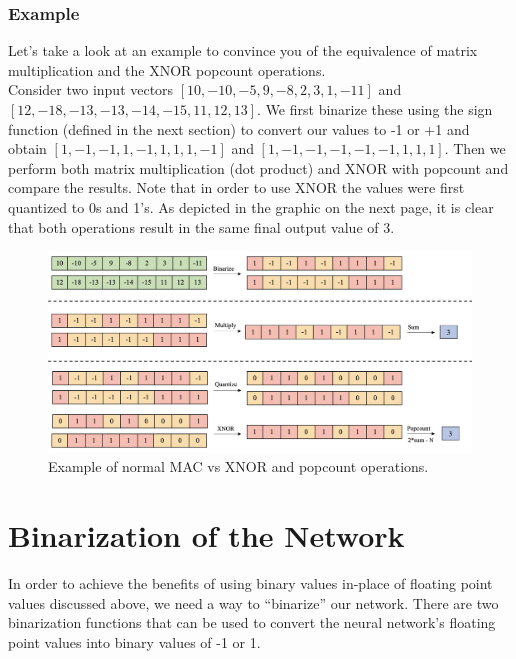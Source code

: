 \subsubsection{Example}
Let's take a look at an example to convince you of the equivalence of matrix multiplication and the XNOR popcount operations. \\

Consider two input vectors $[10, -10, -5, 9, -8, 2, 3, 1, -11]$ and $[12, -18, -13, -13, -14, -15, 11, 12, 13].$ We first binarize these using the sign function (defined in the next section) to convert our values to -1 or +1 and obtain $[1, -1, -1, 1, -1, 1, 1, 1, -1]$ and $[1, -1, -1, -1, -1, -1, 1, 1, 1]$. Then we perform both matrix multiplication (dot product) and XNOR with popcount and compare the results. Note that in order to use XNOR the values were first quantized to 0s and 1's. As depicted in the graphic on the next page, it is clear that both operations result in the same final output value of $3$. \\

\begin{figure}[htbp]
\centerline{\includegraphics[scale = .50]{images/example.png}}
\label{fig:examplebnn}
\caption{Example of normal MAC vs XNOR and popcount operations.}
\end{figure}


\section{Binarization of the Network}
In order to achieve the benefits of using binary values in-place of floating point values discussed above, we need a way to ``binarize''
 our network. There are two binarization functions that can be used to convert the neural network's floating point values into binary values of -1 or 1. 

